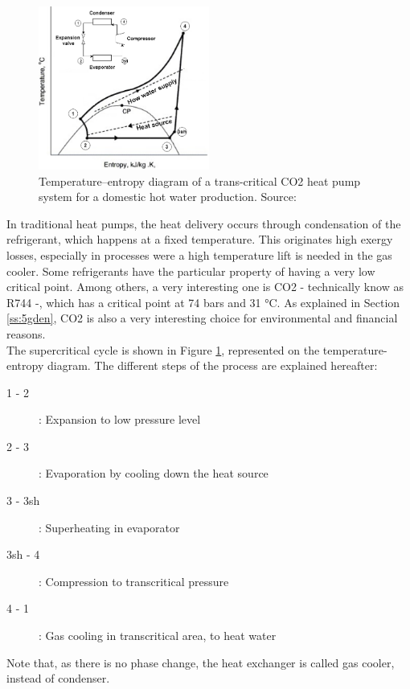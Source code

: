 \documentclass{article}
\begin{document}
\begin{figure}[htp]
	\centering
	\includegraphics[width=0.5\textwidth]{HP_cylce_CO2.png}
	\caption{Temperature–entropy diagram of a trans-critical CO2 heat pump system for a domestic hot water production. Source: \cite{kimPerformanceTranscriticalCO22005}}
	\label{fig:hp_CO2}
\end{figure}

In traditional heat pumps, the heat delivery occurs through condensation of the refrigerant, which happens at a fixed temperature. This originates high exergy losses, especially in processes were a high temperature lift is needed in the gas cooler. Some refrigerants have the particular property of having a very low critical point. Among others, a very interesting one is CO2 - technically know as R744 -, which has a critical point at 74 bars and 31 \si{\celsius}\cite{cavalliniPROPERTIESCO2REFRIGERANT}. As explained in Section \ref{ss:5gden}, CO2 is also a very interesting choice for environmental and financial reasons.\\

The supercritical cycle is shown in Figure \ref{fig:hp_CO2}, represented on the temperature-entropy diagram. The different steps of the process are explained hereafter: 
\begin{description}
\item [1 - 2]: Expansion to low pressure level
\item [2 - 3]: Evaporation by cooling down the heat source
\item [3 - 3sh]: Superheating in evaporator
\item [3sh - 4]: Compression to transcritical pressure
\item [4 - 1]: Gas cooling in transcritical area, to heat water
\end{description}
Note that, as there is no phase change, the heat exchanger is called gas cooler, instead of condenser.\\
\end{document}
